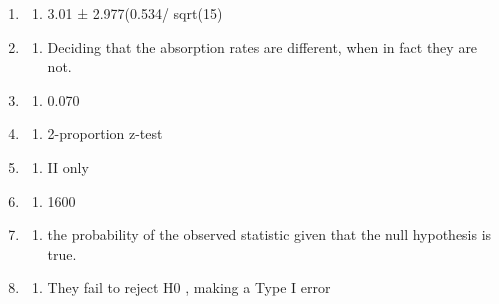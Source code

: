 \documentclass[
]{article}
\providecommand{\tightlist}{%
  \setlength{\itemsep}{0pt}\setlength{\parskip}{0pt}}
\begin{document}
\begin{enumerate}
\def\labelenumi{\arabic{enumi}.}
\item
  \begin{enumerate}
  \def\labelenumii{\Alph{enumii})}
  \setcounter{enumii}{1}
  \tightlist
  \item
    3.01 ± 2.977(0.534/ sqrt(15)
  \end{enumerate}
\item
  \begin{enumerate}
  \def\labelenumii{\Alph{enumii})}
  \tightlist
  \item
    Deciding that the absorption rates are different, when in fact they
    are not.
  \end{enumerate}
\item
  \begin{enumerate}
  \def\labelenumii{\Alph{enumii})}
  \setcounter{enumii}{3}
  \tightlist
  \item
    0.070
  \end{enumerate}
\item
  \begin{enumerate}
  \def\labelenumii{\Alph{enumii})}
  \setcounter{enumii}{1}
  \tightlist
  \item
    2-proportion z-test
  \end{enumerate}
\item
  \begin{enumerate}
  \def\labelenumii{\Alph{enumii})}
  \setcounter{enumii}{1}
  \tightlist
  \item
    II only
  \end{enumerate}
\item
  \begin{enumerate}
  \def\labelenumii{\Alph{enumii})}
  \setcounter{enumii}{4}
  \tightlist
  \item
    1600
  \end{enumerate}
\item
  \begin{enumerate}
  \def\labelenumii{\Alph{enumii})}
  \setcounter{enumii}{3}
  \tightlist
  \item
    the probability of the observed statistic given that the null
    hypothesis is true.
  \end{enumerate}
\item
  \begin{enumerate}
  \def\labelenumii{\Alph{enumii})}
  \setcounter{enumii}{3}
  \tightlist
  \item
    They fail to reject H0 , making a Type I error

\end{enumerate}
\end{enumerate}
\end{document}
